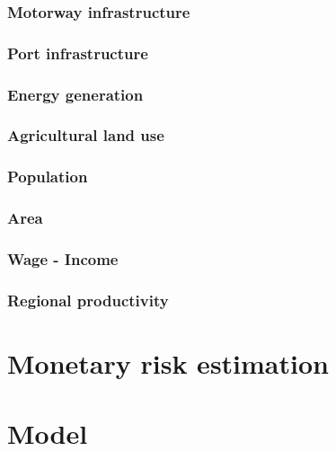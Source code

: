 \documentclass[10pt,a4]{article}
\begin{document}
\subsubsection{Motorway infrastructure}
\subsubsection{Port infrastructure}
\subsubsection{Energy generation}
\subsubsection{Agricultural land use}
\subsubsection{Population}
\subsubsection{Area}
\subsubsection{Wage - Income}
\subsubsection{Regional productivity}

\section{Monetary risk estimation}
\section{Model}
\end{document}
